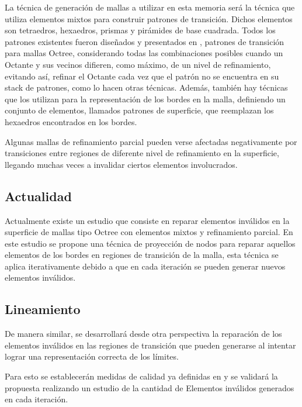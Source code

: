 La técnica de generación de mallas a utilizar en esta memoria será la técnica que utiliza elementos mixtos para construir patrones de transición.
Dichos elementos son tetraedros, hexaedros, prismas y pirámides de base cuadrada. Todos los patrones existentes fueron diseñados y presentados en \cite{Gonzalez2014}, patrones de transición para mallas Octree, considerando todas las combinaciones posibles cuando un Octante y sus vecinos difieren, como máximo, de un nivel de refinamiento, evitando así, refinar el Octante cada vez que el patrón no se encuentra en su stack de patrones, como lo hacen otras técnicas. Además, también hay técnicas que los utilizan para la representación de los bordes en la malla, definiendo un conjunto de elementos, llamados patrones de superficie, que reemplazan los hexaedros encontrados en los bordes.

Algunas mallas de refinamiento parcial pueden verse afectadas negativamente por transiciones entre regiones de diferente nivel de refinamiento en la superficie, llegando muchas veces a invalidar ciertos elementos involucrados. 

\subsection{Actualidad}

Actualmente existe un estudio \cite{daines2018repairing} que consiste en reparar elementos inválidos en la superficie de mallas tipo Octree con elementos mixtos y refinamiento parcial. En este estudio se propone una técnica de proyección de nodos para reparar aquellos elementos de los bordes en regiones de transición de la malla, esta técnica se aplica iterativamente debido a que en cada iteración se pueden generar nuevos elementos inválidos.


\subsection{Lineamiento}

De manera similar, se desarrollará desde otra perspectiva la reparación de los elementos inválidos en las regiones de transición que pueden generarse al intentar lograr una representación correcta de los límites.

Para esto se establecerán medidas de calidad ya definidas en  \cite{daines2018repairing} y se validará la propuesta realizando un estudio de la cantidad de Elementos inválidos generados en cada iteración.

